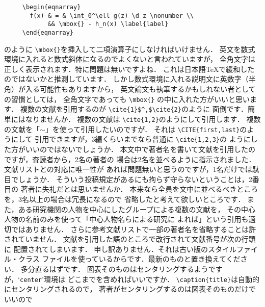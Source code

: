 \documentclass[onecolumn]{jsce}  %
\begin{document}
\begin{Enumerate}
\renewcommand{\baselinestretch}{0.75}\small\normalsize
\begin{verbatim}
     \begin{eqnarray}
       f(x) & = & \int_0^\ell g(z) \d z \nonumber \\
            && \mbox{} - h_n(x) \label{label}
     \end{eqnarray}
\end{verbatim}
\renewcommand{\baselinestretch}{1}\small\normalsize
のように \verb+\mbox{}+を挿入して二項演算子にしなければいけません．
%
\Qitem 英文を数式環境に入れると数式斜体になるのでよくないと言われていますが，
全角文字は正しく表示されます．特に問題は無いですよね．
\Aitem これは日本語\TeX で緩和したのではないかと推測しています．
しかし数式環境に入れる説明文に英数字（半角）が入る可能性もありますから，
英文論文も執筆するかもしれない者としての習慣としては，
全角文字であっても \verb+\mbox{}+ の中に入れた方がいいと思います．
%
\Qitem 複数の文献を引用するのが \verb+\cite{1}$^,$\cite{2}+のように
面倒です．簡単にはなりませんか．
\Aitem 複数の文献は \verb+\cite{1,2}+のようにして引用\cite{1,2}します．
%
\Qitem 複数の文献を「$\sim$」を使って引用したいのですが．
\Aitem それは \verb+\CITE{first,last}+のようにして
引用できますが，3編くらいまでなら普通に \verb+\cite{1,2,3}+の
ようにした方\cite{2,3,4}がいいのではないでしょうか．
%
\Qitem 本文中で著者名を書いて文献を引用したのですが，査読者から，2名の著者の
場合は2名を並べるように指示されました．文献リストとの対応に唯一性が
あれば問題無いと思うのですが，1名だけでは駄目でしょうか．
\Aitem そういう投稿規定があるにも拘らず守らないということは，2番目の
著者に失礼だとは思いませんか．
本来なら全員を文中に並べるべきところを，3名以上の場合は冗長になるので
省略したと考えて欲しいところです．
また，ある研究機関の人物を中心にしたグループによる複数の文献を，
その中心人物の名前のみを使って「中心人物名ら\cite{1,2}による研究に
よれば」という引用も適切ではありません．
さらに参考文献リストで一部の著者名を省略することは許されていません．
%
\Qitem 文献を引用した語のところで改行されて文献番号が次の行頭に
配置されてしまいます．
\Aitem 申し訳ありません．それは古い版のスタイルファイル・クラス
ファイルを使っているからです．最新のものと置き換えてください．
多分直るはずです．
%
\Qitem 図表そのものはセンタリングするようですが，`{\tt center}'環境は
どこまでを含めればいいですか．
\Aitem \verb+\caption{title}+は自動的にセンタリングされるので，
著者がセンタリングするのは図表そのものだけでいいので


\end{Enumerate}
\end{document}
